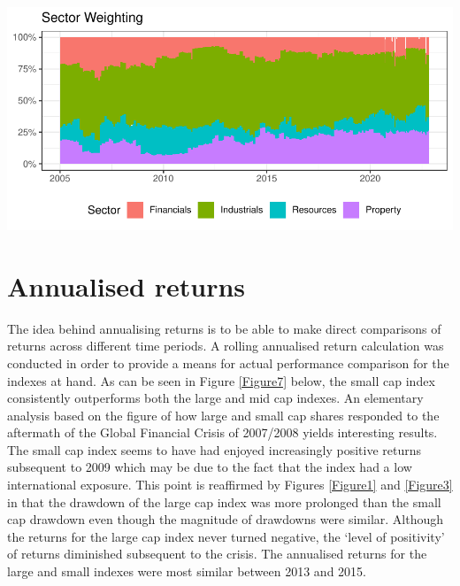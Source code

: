 \documentclass[11pt,preprint, authoryear]{elsarticle}
\let\origfigure\figure
\let\endorigfigure\endfigure
\renewenvironment{figure}[1][2] {
    \expandafter\origfigure\expandafter[H]
} {
    \endorigfigure
}
\numberwithin{equation}{section}
\numberwithin{figure}{section}
\numberwithin{table}{section}
\begin{document}
\begin{figure}[H]

{\centering \includegraphics{Volatility-of-Shares_files/figure-latex/Figure6-1} 

}

\caption{Sector weights for Small Cap index \label{Figure6}}\label{fig:Figure6}
\end{figure}

\hypertarget{annualised-returns}{%
\section{\texorpdfstring{Annualised returns
\label{Returns}}{Annualised returns }}\label{annualised-returns}}

The idea behind annualising returns is to be able to make direct
comparisons of returns across different time periods. A rolling
annualised return calculation was conducted in order to provide a means
for actual performance comparison for the indexes at hand. As can be
seen in Figure \ref{Figure7} below, the small cap index consistently
outperforms both the large and mid cap indexes. An elementary analysis
based on the figure of how large and small cap shares responded to the
aftermath of the Global Financial Crisis of 2007/2008 yields interesting
results. The small cap index seems to have had enjoyed increasingly
positive returns subsequent to 2009 which may be due to the fact that
the index had a low international exposure. This point is reaffirmed by
Figures \ref{Figure1} and \ref{Figure3} in that the drawdown of the
large cap index was more prolonged than the small cap drawdown even
though the magnitude of drawdowns were similar. Although the returns for
the large cap index never turned negative, the `level of positivity' of
returns diminished subsequent to the crisis. The annualised returns for
the large and small indexes were most similar between 2013 and 2015.
\end{document}
